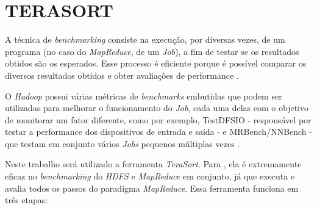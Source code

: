 \section{TERASORT} \label{sec:terasort}

A técnica de \textit{benchmarking} consiste na execução, por diversas vezes, de um programa (no caso do \textit{MapReduce}, de um \textit{Job}), a fim de testar se os resultados obtidos são os esperados. Esse processo é eficiente porque é possível comparar os diversos resultados obtidos e obter avaliações de performance \cite{HadoopBook15}.

O \textit{Hadoop} possui várias métricas de \textit{benchmarks} embutidas que podem ser utilizadas para melhorar o funcionamento do \textit{Job}, cada uma delas com o objetivo de monitorar um fator diferente, como por exemplo, TestDFSIO  - responsável por testar a performance dos dispositivos de entrada e saída - e MRBench/NNBench - que testam em conjunto vários \textit{Jobs} pequenos múltiplas vezes \cite{HadoopBook15}.

Neste trabalho será utilizado a ferramenta \textit{TeraSort}. Para \textcite{HadoopBook15}, ela é extremamente eficaz no \textit{benchmarking} do \textit{HDFS} e \textit{MapReduce} em conjunto, já que executa e avalia todos os passos do paradigma \textit{MapReduce}. Essa ferramenta funciona em três etapas:

